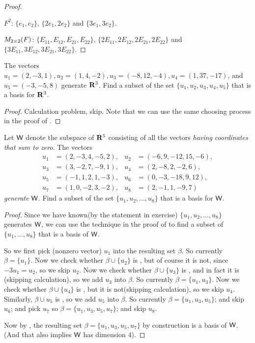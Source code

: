 \begin{proof}\ 

\(F^2\): \(\{ e_1, e_2 \}\), \(\{ 2 e_1, 2 e_2 \}\) and \(\{ 3 e_1, 3 e_2 \}\).

\(M_{2 \times 2}(F)\): \(\{ E_{11}, E_{12}, E_{21}, E_{22} \}\), \(\{ 2 E_{11}, 2 E_{12}, 2 E_{21}, 2 E_{22} \}\) and \(\{ 3 E_{11}, 3 E_{12}, 3 E_{21}, 3 E_{22} \}\).
\end{proof}

\begin{exercise} \label{exercise 1.6.7}
The vectors \(u_1 = (2, -3, 1), u_2 = (1, 4, -2), u_3 = (-8, 12, -4), u_4 = (1, 37, -17)\), and \(u_5 = (-3, -5, 8)\) generate \(\mathbf{R}^3\).
Find a subset of the set \(\{ u_1, u_2, u_3, u_4, u_5 \}\) that is a basis for \(\mathbf{R}^3\).
\end{exercise}

\begin{proof}
Calculation problem, skip.
Note that we can use the same choosing process in the proof of .
\end{proof}

\begin{exercise} \label{exercise 1.6.8}
Let \(\textsf{W}\) denote the subspace of \(\mathbf{R}^5\) consisting of all the vectors \emph{having coordinates that sum to zero}.
The vectors
\begin{align*}
    u_1 & = (2, -3, 4, -5, 2), & u_2 & = (-6, 9, - 12, 15, -6), \\
    u_3 & = (3, -2, 7, -9, 1), & u_4 & = (2, -8, 2, -2, 6), \\
    u_5 & = (-1, 1, 2, 1, -3), & u_6 & = (0, -3, -18, 9, 12) , \\
    u_7 & = (1, 0, -2, 3, -2), & u_8 & = (2, -1, 1, -9, 7)
\end{align*}
\emph{generate} \(\textsf{W}\).
Find a subset of the set \(\{ u_1, u_2, ..., u_8 \}\) that is a basis for \(\textsf{W}\).
\end{exercise}

\begin{proof}
Since we have known(by the statement in exercise) \(\{ u_1, u_2, ..., u_8 \}\) generates \(\textsf{W}\), we can use the technique in the proof of  to find a subset of \(\{ u_1, ..., u_8 \}\) that is a basis of \(\textsf{W}\).

So we first pick (nonzero vector) \(u_1\) into the resulting set \(\beta\).
So currently \(\beta = \{ u_1 \}\).
Now we check whether \(\beta \cup \{u_2\}\) is \LID{}, but of course it is not, since \(-3u_1 = u_2\), so we skip \(u_2\).
Now we check whether \(\beta \cup \{u_3\}\) is \LID{}, and in fact it is (skipping calculation), so we add \(u_3\) into \(\beta\).
So currently \(\beta = \{ u_1, u_3 \}\).
Now we check whether \(\beta \cup \{u_4\}\) is \LID{}, but it is not(skipping calculation), so we skip \(u_4\).
Similarly, \(\beta \cup u_5\) is \LID{}, so we add \(u_5\) into \(\beta\).
So currently \(\beta = \{ u_1, u_3, u_5 \}\);
and skip \(u_6\);
and pick \(u_7\) so \(\beta = \{ u_1, u_3, u_5, u_7 \}\);
and skip \(u_8\).

Now by , the resulting set \(\beta = \{ u_1, u_3, u_5, u_7 \}\) by construction is a basis of \(\textsf{W}\).
(And that also implies \(\textsf{W}\) has dimension \(4\)).
\end{proof}

